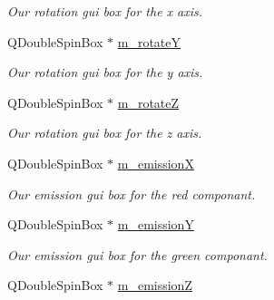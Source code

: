 \begin{DoxyCompactItemize}
\begin{DoxyCompactList}\small\item\em Our rotation gui box for the x axis. \end{DoxyCompactList}\item 
\hypertarget{class_light_manager_ae89f970c4c1b460c00a58e89c680a8df}{Q\-Double\-Spin\-Box $\ast$ \hyperlink{class_light_manager_ae89f970c4c1b460c00a58e89c680a8df}{m\-\_\-rotate\-Y}}\label{class_light_manager_ae89f970c4c1b460c00a58e89c680a8df}

\begin{DoxyCompactList}\small\item\em Our rotation gui box for the y axis. \end{DoxyCompactList}\item 
\hypertarget{class_light_manager_a1405165d73e3fc61b6ec5c358c230934}{Q\-Double\-Spin\-Box $\ast$ \hyperlink{class_light_manager_a1405165d73e3fc61b6ec5c358c230934}{m\-\_\-rotate\-Z}}\label{class_light_manager_a1405165d73e3fc61b6ec5c358c230934}

\begin{DoxyCompactList}\small\item\em Our rotation gui box for the z axis. \end{DoxyCompactList}\item 
\hypertarget{class_light_manager_ad0f1a51434ca8004b6bac56376523e31}{Q\-Double\-Spin\-Box $\ast$ \hyperlink{class_light_manager_ad0f1a51434ca8004b6bac56376523e31}{m\-\_\-emission\-X}}\label{class_light_manager_ad0f1a51434ca8004b6bac56376523e31}

\begin{DoxyCompactList}\small\item\em Our emission gui box for the red componant. \end{DoxyCompactList}\item 
\hypertarget{class_light_manager_a124f943b2a15b441cc0ab4d0e1d81cf0}{Q\-Double\-Spin\-Box $\ast$ \hyperlink{class_light_manager_a124f943b2a15b441cc0ab4d0e1d81cf0}{m\-\_\-emission\-Y}}\label{class_light_manager_a124f943b2a15b441cc0ab4d0e1d81cf0}

\begin{DoxyCompactList}\small\item\em Our emission gui box for the green componant. \end{DoxyCompactList}\item 
\hypertarget{class_light_manager_acd3490628257ee8e583135df9361afb2}{Q\-Double\-Spin\-Box $\ast$ \hyperlink{class_light_manager_acd3490628257ee8e583135df9361afb2}{m\-\_\-emission\-Z}}\label{class_light_manager_acd3490628257ee8e583135df9361afb2}


\end{DoxyCompactItemize}
